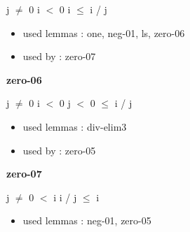 \documentclass[a4paper]{article}
\begin{document}
j $\neq$ 0 \Fol i $<$ 0 \Imp i $\le$ i / j

\begin{itemize}


\item       used lemmas  : one, neg-01, ls, zero-06
\item       used by      : zero-07

\end{itemize}

\medskip

\bigskip

{\large\bf zero-06}

\medskip

j $\neq$ 0 \Fol i $<$ 0 \And j $<$ 0  $\le$ i / j

\begin{itemize}


\item       used lemmas  : div-elim3
\item       used by      : zero-05

\end{itemize}

\medskip

\bigskip

{\large\bf zero-07}

\medskip

j $\neq$ 0  $<$ i \Imp i / j $\le$ i

\begin{itemize}


\item       used lemmas  : neg-01, zero-05

\end{itemize}

\medskip
\end{document}
